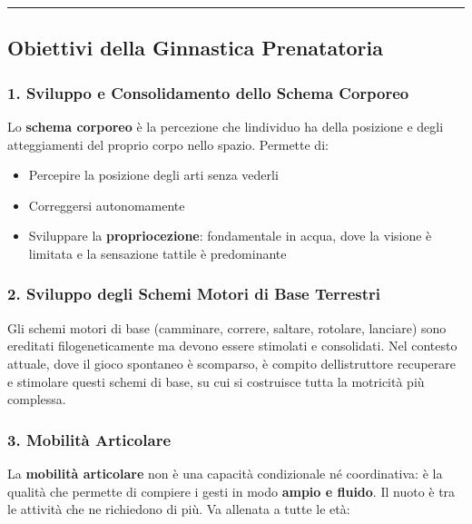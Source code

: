 \documentclass[a4paper,11pt]{article}
\providecommand{\tightlist}{%
  \setlength{\itemsep}{0pt}\setlength{\parskip}{0pt}}
\begin{document}
\begin{center}\rule{0.5\linewidth}{0.5pt}\end{center}

\subsection{Obiettivi della Ginnastica
      Prenatatoria}\label{obiettivi-della-ginnastica-prenatatoria}

\subsubsection{1. Sviluppo e Consolidamento dello Schema
      Corporeo}\label{sviluppo-e-consolidamento-dello-schema-corporeo}

Lo \textbf{schema corporeo} è la percezione che
l\textquotesingle individuo ha della posizione e degli atteggiamenti del
proprio corpo nello spazio. Permette di:

\begin{itemize}
      \tightlist
      \item
            Percepire la posizione degli arti senza vederli
      \item
            Correggersi autonomamente
      \item
            Sviluppare la \textbf{propriocezione}: fondamentale in acqua, dove la
            visione è limitata e la sensazione tattile è predominante
\end{itemize}

\subsubsection{2. Sviluppo degli Schemi Motori di Base
      Terrestri}\label{sviluppo-degli-schemi-motori-di-base-terrestri}

Gli schemi motori di base (camminare, correre, saltare, rotolare,
lanciare) sono ereditati filogeneticamente ma devono essere stimolati e
consolidati. Nel contesto attuale, dove il gioco spontaneo è scomparso,
è compito dell\textquotesingle istruttore recuperare e stimolare questi
schemi di base, su cui si costruisce tutta la motricità più complessa.

\subsubsection{3. Mobilità Articolare}\label{mobilituxe0-articolare-1}

La \textbf{mobilità articolare} non è una capacità condizionale né
coordinativa: è la qualità che permette di compiere i gesti in modo
\textbf{ampio e fluido}. Il nuoto è tra le attività che ne richiedono di
più. Va allenata a tutte le età:
\end{document}
